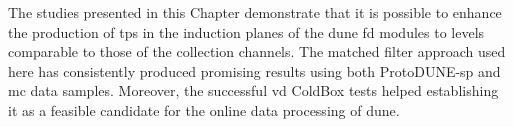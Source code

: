The studies presented in this Chapter demonstrate that it is possible to enhance the production of \gls{tp}s in the induction planes of the \gls{dune} \gls{fd} modules to levels comparable to those of the collection channels. The matched filter approach used here has consistently produced promising results using both ProtoDUNE-\gls{sp} and \gls{mc} data samples. Moreover, the successful \gls{vd} ColdBox tests helped establishing it as a feasible candidate for the online data processing of \gls{dune}.